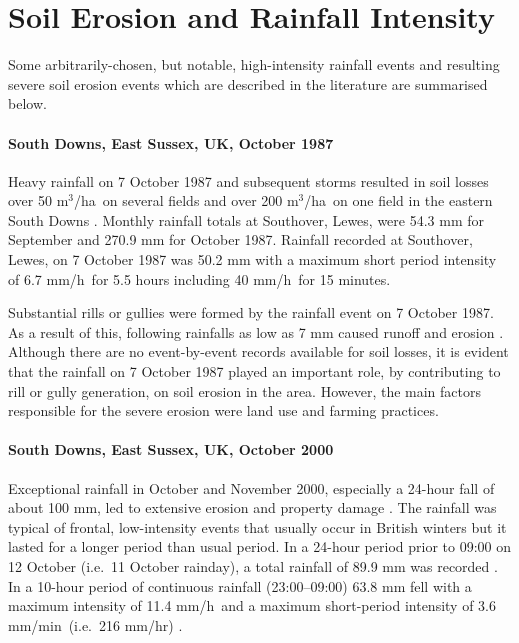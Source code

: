 \section{Soil Erosion and Rainfall Intensity}
\label{sec:RainfallIntensityAndSoilErosion}


Some arbitrarily-chosen, but notable, high-intensity rainfall events and
resulting severe soil erosion events which are described in the literature are
summarised below.

\paragraph{South Downs, East Sussex, UK, October 1987
\citep{boardman1988-333}}
\label{sec:SouthDownsOctober1987}

Heavy rainfall on 7 October 1987 and subsequent storms resulted in soil losses
over 50 m$^3$/ha\ on several fields and over 200 m$^3$/ha\ on one field in the
eastern South Downs \citep{boardman1988-333}. Monthly rainfall totals at
Southover, Lewes, were 54.3 mm for September and 270.9 mm for October 1987.
Rainfall recorded at Southover, Lewes, on 7 October 1987 was 50.2 mm with a
maximum short period intensity of 6.7 mm/h\ for 5.5 hours including 40 mm/h\ for
15 minutes.

Substantial rills or gullies were formed by the rainfall event on 7 October
1987. As a result of this, following rainfalls as low as 7 mm caused runoff and
erosion \citep{boardman1988-333}.
Although there are no event-by-event records available for soil losses, it is
evident that the rainfall on 7 October 1987 played an important role, by
contributing to rill or gully generation, on  soil erosion in the area. However,
the main factors responsible for the severe erosion were land use and farming
practices.

\paragraph{South Downs, East Sussex, UK, October 2000
\citep{boardman2001-346}}
\label{sec:SouthDownsOctober2000}

Exceptional rainfall in October and November 2000, especially a 24-hour fall of
about 100 mm, led to extensive erosion and property damage
\citep{boardman2001-346}. The rainfall was typical of frontal, low-intensity
events that usually occur in British winters but it lasted for a longer period
than usual period. In a 24-hour period prior to 09:00 on 12 October (i.e.\ 11
October rainday), a total rainfall of 89.9 mm was recorded
\citep{boardman2001-346}.
In a 10-hour period of continuous rainfall (23:00--09:00) 63.8 mm fell with a
maximum intensity of 11.4 mm/h\ and a maximum short-period intensity of 3.6
mm/min\ (i.e.\ 216 mm/hr) \citep{boardman2001-346}.

